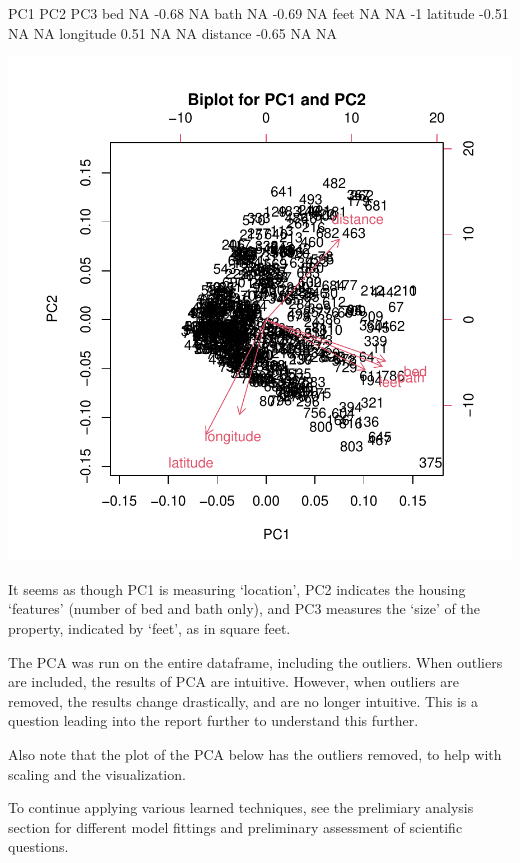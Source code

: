 \documentclass[11pt, a4paper]{article}
\begin{document}
\begin{Schunk}
\begin{Soutput}
            PC1   PC2 PC3
bed          NA -0.68  NA
bath         NA -0.69  NA
feet         NA    NA  -1
latitude  -0.51    NA  NA
longitude  0.51    NA  NA
distance  -0.65    NA  NA
\end{Soutput}
\end{Schunk}
\includegraphics{exploratory_analysis-006}

It seems as though PC1 is measuring `location', PC2 indicates the housing `features' (number of bed and bath only), and PC3 measures the `size' of the property, indicated by `feet', as in square feet. 
\par
The PCA was run on the entire dataframe, including the outliers. When outliers are included, the results of PCA are intuitive. However, when outliers are removed, the results change drastically, and are no longer intuitive. This is a question leading into the report further to understand this further. 
\par
Also note that the plot of the PCA below has the outliers removed, to help with scaling and the visualization.
\par
To continue applying various learned techniques, see the prelimiary analysis section for different model fittings and preliminary assessment of scientific questions.
\end{document}
